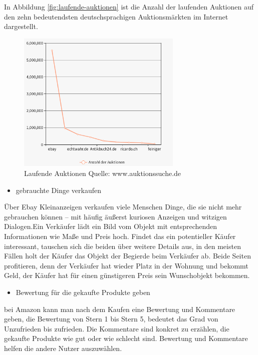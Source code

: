 In Abbildung \vref{fig:laufende-auktionen} ist die Anzahl der laufenden Auktionen auf den zehn bedeutendsten deutschsprachigen Auktionsmärkten im Internet dargestellt.

\begin{figure}
	\centering
	\includegraphics[width=0.7\textwidth]{bilder/laufende-auktionen.png}
	\caption{Laufende Auktionen Quelle: www.auktionssuche.de}
	\label{fig:laufende-auktionen}
\end{figure}

\begin{itemize}
\item gebrauchte Dinge verkaufen
\end{itemize}

Über Ebay Kleinanzeigen verkaufen viele Menschen Dinge, die sie nicht mehr gebrauchen können – mit häufig äußerst kuriosen Anzeigen und witzigen Dialogen.Ein Verkäufer lädt ein Bild vom Objekt mit entsprechenden Informationen wie Maße und Preis hoch. Findet das ein potentieller Käufer interessant, tauschen sich die beiden über weitere Details aus, in den meisten Fällen holt der Käufer das Objekt der Begierde beim Verkäufer ab. Beide Seiten profitieren, denn der Verkäufer hat wieder Platz in der Wohnung und bekommt Geld, der Käufer hat für einen günstigeren Preis sein Wunschobjekt bekommen.

\begin{itemize}
\item Bewertung für die gekaufte Produkte geben
\end{itemize}

bei Amazon kann man nach dem Kaufen eine Bewertung und Kommentare geben, die Bewertung von Stern 1 bis Stern 5, bedeutet das Grad von Unzufrieden bis zufrieden. Die Kommentare sind konkret zu erzählen, die gekaufte Produkte wie gut oder wie schlecht sind.
Bewertung und Kommentare helfen die andere Nutzer auszuwählen.


